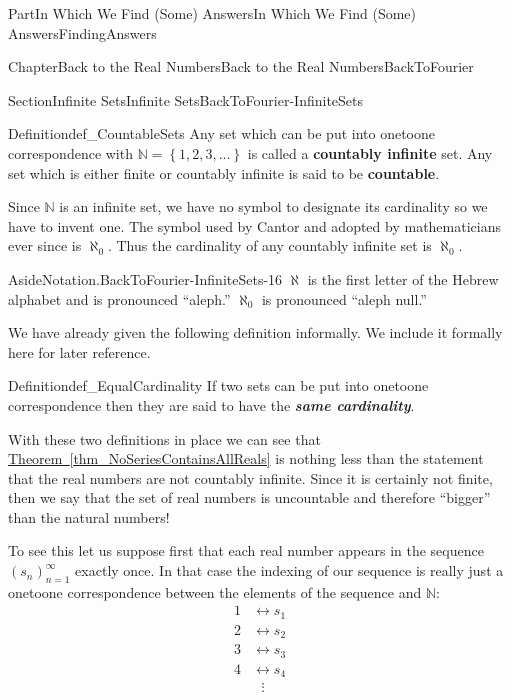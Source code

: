 \documentclass[oneside,10pt,]{book}
\newcommand{\xreffont}{\relax}
\newcommand{\alert}[1]{\textbf{\textit{#1}}}
\newcommand{\terminology}[1]{\textbf{#1}}
\numberwithin{equation}{part}
\newcommand{\NN}{\mathbb {N}}
\newcommand{\amp}{&}
\begin{document}
\begin{partptx}{Part}{In Which We Find (Some) Answers}{}{In Which We Find (Some) Answers}{}{}{FindingAnswers}
\begin{chapterptx}{Chapter}{Back to the Real Numbers}{}{Back to the Real Numbers}{}{}{BackToFourier}
\begin{sectionptx}{Section}{Infinite Sets}{}{Infinite Sets}{}{}{BackToFourier-InfiniteSets}
\begin{definition}{Definition}{}{def_CountableSets}%
%
%
Any set which can be put into one\textendash{}to\textendash{}one correspondence with \(\NN=\left\{1,2,3,\ldots\right\}\) is called a \terminology{countably infinite} set.  Any set which is either finite or countably infinite is said to be \terminology{countable}.%
\end{definition}
 Since \(\NN\) is an infinite set, we have no symbol to designate its cardinality so we have to invent one.  The symbol used by Cantor and adopted by mathematicians ever since is \(\aleph_0\).  Thus the cardinality of any countably infinite set is \(\aleph_0\).%
\begin{aside}{Aside}{Notation.}{BackToFourier-InfiniteSets-16}%
\(\aleph{}\) is the first letter of the Hebrew alphabet and is pronounced ``aleph.'' \(\aleph_0\) is pronounced ``aleph null.''%
\end{aside}
We have already given the following definition informally.  We include it formally here for later reference.%
\begin{definition}{Definition}{}{def_EqualCardinality}%
%
If two sets can be put into one\textendash{}to\textendash{}one correspondence then they are said to have the \alert{same cardinality}.%
\end{definition}
With these two definitions in place we can see that \hyperref[thm_NoSeriesContainsAllReals]{Theorem~{\xreffont\ref{thm_NoSeriesContainsAllReals}}} is nothing less than the statement that the real numbers are not countably infinite.  Since it is certainly not finite, then we say that the set of real numbers is uncountable and therefore ``bigger'' than the natural numbers!%
\par
To see this let us suppose first that each real number appears in the sequence \((s_n)_{n=1}^\infty\) exactly once.  In that case the indexing of our sequence is really just a one\textendash{}to\textendash{}one correspondence between the elements of the sequence and \(\NN:\)%
\begin{align*}
1\amp \leftrightarrow s_1\\
2\amp \leftrightarrow s_2\\
3\amp \leftrightarrow s_3\\
4\amp \leftrightarrow s_4\\
\amp \ \ \ \vdots
\end{align*}
%
\par

\end{sectionptx}
\end{chapterptx}
\end{partptx}
\end{document}

